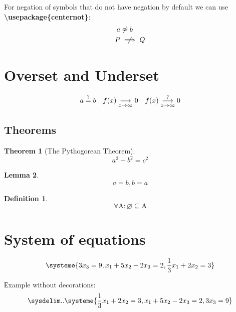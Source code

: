 \documentclass[12pt]{article}
\newtheorem{thm}{Theorem}
\newtheorem{lem}[thm]{Lemma} %
\newtheorem{defn}{Definition}
\begin{document}
\noindent For negation of symbols that do not have negation by default we can use \textbf{\textbackslash usepackage\{centernot\}}:
\begin{align*}
    a &\centernot \approx b \\
    P &\centernot \implies Q \\
\end{align*}

\section{Overset and Underset}

\begin{equation*}
    \begin{array}{c c c}
        a \overset{?}{=} b &
        f(x) \underset{x \to \infty}{\longrightarrow} 0 &
        f(x) \overset{?}{\underset{x \to \infty}{\longrightarrow}} 0
    \end{array}
\end{equation*}

\subsection{Theorems}

\begin{thm}[The Pythogorean Theorem] \label{eq:PythogoreanTheorem}
    $$ a^2 + b^2 = c^2 $$
\end{thm}

\begin{lem}
    $$  a = b, b = a $$
\end{lem}

\begin{defn}
    $$ \forall \mathrm{A}: \varnothing \subseteq \mathrm{A} $$
\end{defn}

\section{System of equations}

\begin{equation*}
    \systeme{
        3x_{3} = 9,
        x_{1} + 5x_{2} - 2x_{3} = 2,
        \frac{1}{3}x_{1} + 2x_{2} = 3
    }
\end{equation*}

\noindent Еxample without decorations:
\begin{equation*}
    \sysdelim..\systeme{
        \frac{1}{3}x_{1} + 2x_{2} = 3,
        x_{1} + 5x_{2} - 2x_{3} = 2,
        3x_{3} = 9
    }
\end{equation*}
\end{document}
